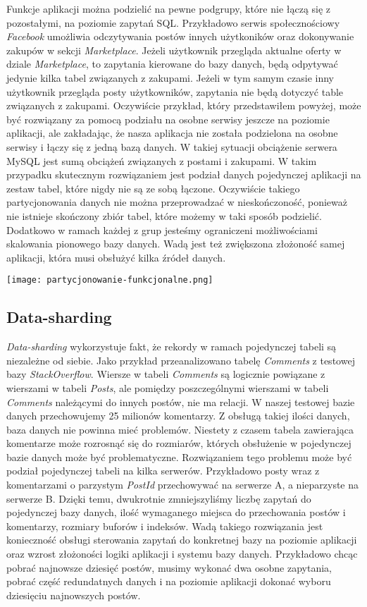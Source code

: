 Funkcje aplikacji można podzielić na pewne podgrupy, które nie łączą się z pozostałymi, na poziomie zapytań SQL. Przykładowo serwis społecznościowy \textit{Facebook} umożliwia odczytywania postów innych użytkoników oraz dokonywanie zakupów w sekcji \textit{Marketplace}. Jeżeli użytkownik przegląda aktualne oferty w dziale \textit{Marketplace}, to zapytania kierowane do bazy danych, będą odpytywać jedynie kilka tabel związanych z zakupami. Jeżeli w tym samym czasie inny użytkownik przegląda posty użytkowników, zapytania nie będą dotyczyć table związanych z zakupami. Oczywiście przykład, który przedstawiłem powyżej, może być rozwiązany za pomocą podziału na osobne serwisy jeszcze na poziomie aplikacji, ale zakładając, że nasza aplikacja nie została podzielona na osobne serwisy i łączy się z jedną bazą danych. W takiej sytuacji obciążenie serwera MySQL jest sumą obciążeń związanych z postami i zakupami. W takim przypadku skutecznym rozwiązaniem jest podział danych pojedynczej aplikacji na zestaw tabel, które nigdy nie są ze sobą łączone. Oczywiście takiego partycjonowania danych nie można przeprowadzać w nieskończoność, ponieważ nie istnieje skończony zbiór tabel, które możemy w taki sposób podzielić. Dodatkowo w ramach każdej z grup jesteśmy ograniczeni możliwościami skalowania pionowego bazy danych. Wadą jest też zwiększona złożoność samej aplikacji, która musi obsłużyć kilka źródeł danych. 

\begin{center}
	\texttt{[image: partycjonowanie-funkcjonalne.png]} 
\end{center}


\subsection{Data-sharding}
 
\textit{Data-sharding} wykorzystuje fakt, że rekordy w ramach pojedynczej tabeli są niezależne od siebie. Jako przykład przeanalizowano tabelę \textit{Comments} z testowej bazy \textit{StackOverflow}.
Wiersze w tabeli \textit{Comments} są logicznie powiązane z wierszami w tabeli \textit{Posts}, ale pomiędzy poszczególnymi wierszami w tabeli \textit{Comments} należącymi do innych postów, nie ma relacji. W naszej testowej bazie danych przechowujemy 25 milionów komentarzy. Z obsługą takiej ilości danych, baza danych nie powinna mieć problemów. Niestety z czasem tabela zawierająca komentarze może rozrosnąć się do rozmiarów, których obsłużenie w pojedynczej bazie danych może być problematyczne. Rozwiązaniem tego problemu może być podział pojedynczej tabeli na kilka serwerów. Przykładowo posty wraz z komentarzami o parzystym \textit{PostId} przechowywać na serwerze A, a nieparzyste na serwerze B. Dzięki temu, dwukrotnie zmniejszyliśmy liczbę zapytań do pojedynczej bazy danych, ilość wymaganego miejsca do przechowania postów i komentarzy, rozmiary buforów i indeksów. Wadą takiego rozwiązania jest konieczność obsługi sterowania zapytań do konkretnej bazy na poziomie aplikacji oraz wzrost złożoności logiki aplikacji i systemu bazy danych. Przykładowo chcąc pobrać najnowsze dziesięć postów, musimy wykonać dwa osobne zapytania, pobrać część redundatnych danych i na poziomie aplikacji dokonać wyboru dziesięciu najnowszych postów.


